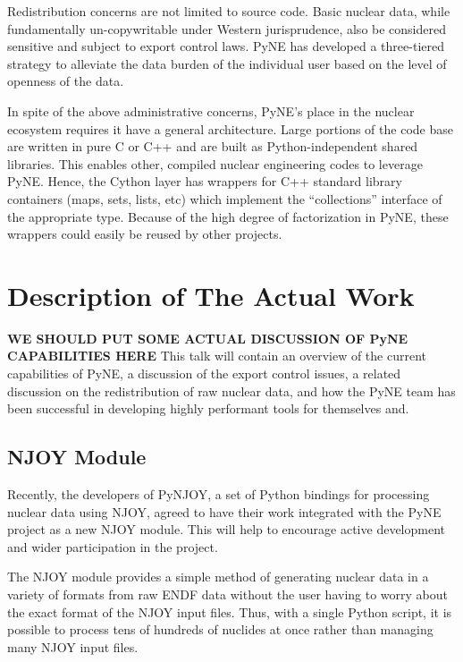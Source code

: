 \documentclass{anstrans}
\begin{document}
Redistribution concerns are not limited to source code.  Basic nuclear data, 
while fundamentally un-copywritable under Western jurisprudence, also 
be considered sensitive and subject to export control laws.  PyNE has developed
a three-tiered strategy to alleviate the data burden of the individual user based 
on the level of openness of the data. 

In spite of the above administrative concerns, PyNE's place in the nuclear ecosystem
requires it have a general architecture.  Large portions of the code base are 
written in pure C or C++ and are built as Python-independent shared libraries. This
enables other, compiled nuclear engineering codes to leverage PyNE.  Hence, the 
Cython layer has wrappers for C++ standard library containers (maps, 
sets, lists, etc) which implement the ``collections'' interface of the 
appropriate type.  Because of the high degree of factorization in PyNE, these wrappers 
could easily be reused by other projects.

\section{Description of The Actual Work}

\textbf{WE SHOULD PUT SOME ACTUAL DISCUSSION OF PyNE CAPABILITIES HERE} This
talk will contain an overview of the current capabilities of PyNE, a discussion
of the export control issues, a related discussion on the redistribution of raw
nuclear data, and how the PyNE team has been successful in developing highly
performant tools for themselves and.

\subsection{NJOY Module}

Recently, the developers of PyNJOY, a set of Python bindings for processing
nuclear data using NJOY, agreed to have their work integrated with the PyNE
project as a new NJOY module. This will help to encourage active development and
wider participation in the project.

The NJOY module provides a simple method of generating nuclear data in a variety
of formats from raw ENDF data without the user having to worry about the exact
format of the NJOY input files. Thus, with a single Python script, it is
possible to process tens of hundreds of nuclides at once rather than managing
many NJOY input files.
\end{document}
